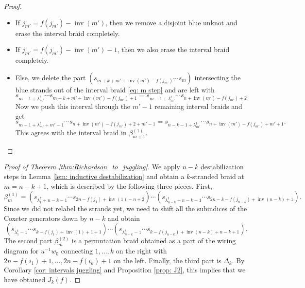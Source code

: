 \documentclass[10pt]{amsart}
\theoremstyle{plain}
\theoremstyle{definition}
\theoremstyle{remark}
\numberwithin{equation}{section}
\DeclareMathOperator{\inv}{inv}
\begin{document}
\begin{proof}
\begin{itemize}
\item[-] If $j_{m'} = f(j_{m'}) - \inv(m')$, then we remove a disjoint blue unknot and erase the interval braid completely.
\item[-] If $j_{m'} = f(j_{m'}) - \inv(m') - 1$, then we also erase the interval braid completely.
\item[-] Else, we delete the part $(s_{m+k+m'+\inv(m')-f(j_{m'})}\cdots s_{m})$ intersecting the blue strands out of the interval braid \eqref{eq: m step} and are left with 
\[
s_{m-1+\lambda^{t}_{m'}}\cdots s_{m+k+m'+\inv(m')-f(j_{m'})+1} = s_{m-1+\lambda^{t}_{m'}}\cdots s_{n+\inv(m')-f(j_{m'}) + 2}.
\]
Now we push this interval through the $m' - 1$ remaining interval braids and get
\begin{equation}\label{eq: push before substract}
s_{m-1+\lambda^{t}_{m'}+m'-1}\cdots s_{n+\inv(m')-f(j_{m'}) + 2+m'-1}=
s_{n-k-1+\lambda^{t}_{m'}}\cdots s_{n+\inv(m')-f(j_{m'}) + m'+1}.
\end{equation}
This agrees with the interval braid in $\beta^{(1)}_{m+1}$.
\end{itemize}
\end{proof}

\begin{proof}[Proof of Theorem \ref{thm:Richardson_to_juggling}]

We apply $n-k$ destabilization steps in Lemma \ref{lem: inductive destabilization} and obtain a $k$-stranded braid at $m=n-k+1$, which is described by the following three pieces. First,
\[
\beta_{m}^{(1)}=\left(s_{\lambda_1^{t}+n-k-1}\cdots s_{2n-f(j_1) +\inv(1) - n+2}\right)\cdots \left(s_{\lambda_{n-k}^{t}+n-k-1}\cdots s_{2n-k-f(j_{n-k}) +\inv(n-k)+1}\right).
\]
Since we did not relabel the strands yet, we need to shift all the subindices of the Coxeter generators down by $n-k$ and obtain
\[
\left(s_{\lambda_1^{t}-1}\cdots s_{k-f(j_1) +\inv(1) +1+1}\right)\cdots \left(s_{\lambda_{n-k}^{t}-1}\cdots s_{k-f(j_{n-k}) +\inv(n-k)+n-k +1}\right).
\]
 The second part $\beta_{m}^{(2)}$ is a permutation braid obtained as a part of the wiring diagram for $u^{-1}w_0$ connecting $1, \dots, k$ on the right with $2n - f(i_1) + 1, \dots, 2n - f(i_k) +1$ on the left. Finally, the third part is $\Delta_k$. By Corollary \ref{cor: intervals juggling} and Proposition \ref{prop: J2}, this implies that we have obtained $J_k(f)$.
\end{proof}
\end{document}
